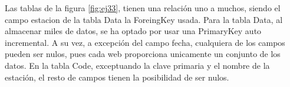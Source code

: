 Las tablas de la figura \ref{fig:ej33}, tienen una relación uno a muchos, siendo el campo estacion de la tabla Data la ForeingKey usada. Para la tabla Data, al almacenar miles de datos, se ha optado por usar una PrimaryKey auto incremental. A su vez, a excepción del campo fecha, cualquiera de los campos pueden ser nulos, pues cada web proporciona unicamente un conjunto de los datos. En la tabla Code, exceptuando la clave primaria y el nombre de la estación, el resto de campos tienen la posibilidad de ser nulos.
